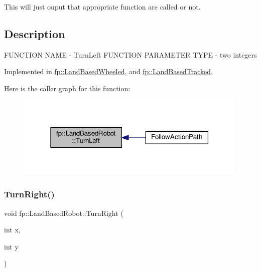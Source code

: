 This will just ouput that appropriate function are called or not. 

\hypertarget{main_8cpp_Description}{}\subsection{Description}\label{main_8cpp_Description}
F\+U\+N\+C\+T\+I\+ON N\+A\+ME -\/ Turn\+Left F\+U\+N\+C\+T\+I\+ON P\+A\+R\+A\+M\+E\+T\+ER T\+Y\+PE -\/ two integers 

Implemented in \hyperlink{classfp_1_1_land_based_wheeled_a2f2434db907aaef26b8f3084e84b3579}{fp\+::\+Land\+Based\+Wheeled}, and \hyperlink{classfp_1_1_land_based_tracked_aab40e1a48e5142491f02b2936c4cacc3}{fp\+::\+Land\+Based\+Tracked}.

Here is the caller graph for this function\+:
\nopagebreak
\begin{figure}[H]
\begin{center}
\leavevmode
\includegraphics[width=315pt]{classfp_1_1_land_based_robot_a359e1012e9093475b7a1b0d38e41a118_icgraph}
\end{center}
\end{figure}
\mbox{\label{classfp_1_1_land_based_robot_a7360e4084bc5254f72ab0d3612644907}} 
\subsubsection{\texorpdfstring{Turn\+Right()}{TurnRight()}}
{\footnotesize\ttfamily void fp\+::\+Land\+Based\+Robot\+::\+Turn\+Right (\begin{DoxyParamCaption}\item[{int}]{x,  }\item[{int}]{y }\end{DoxyParamCaption})\hspace{0.3cm}{\ttfamily [pure virtual]}}



